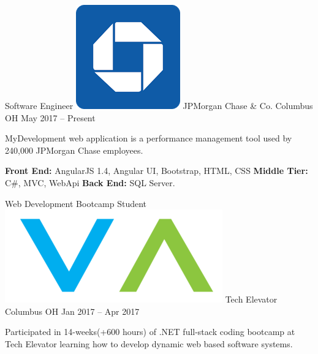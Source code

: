 \vspace{-3mm}
\begin{cventries}
    \vspace{-1mm}  \cventry
    {Software Engineer}
    {\includegraphics[scale=0.07]{img/unnamed.png} JPMorgan Chase \& Co.}
    {Columbus OH}
    {May 2017 – Present}
    {\begin{cvitems}\item {MyDevelopment web application is a performance management tool used by 240,000 JPMorgan Chase employees.}\end{cvitems}   \vspace{7mm}
      \begin{cvitems}\item {\textbf{Front End:} AngularJS 1.4, Angular UI, Bootstrap, HTML, CSS  \hspace{5mm}  \textbf{Middle Tier:} C\#, MVC, WebApi  \hspace{5mm}  \textbf{Back End:} SQL Server.}     
      \end{cvitems}   
    } 
 \cventry    
    {Web Development Bootcamp Student}
    {\includegraphics[scale=0.20]{img/download.png} Tech Elevator}
    {Columbus OH}
    {Jan 2017 – Apr 2017}
    {
   \begin{cvitems}
        \item {Participated in 14-weeks(+600 hours) of .NET full-stack coding bootcamp at Tech Elevator learning how to develop dynamic web based software systems.}
        \end{cvitems}} 
\end{cventries}
